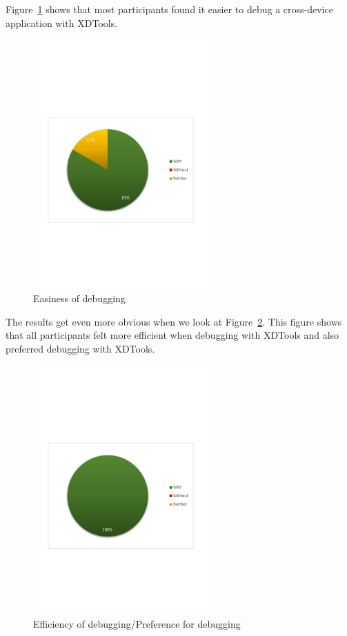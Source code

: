 Figure~\ref{fig:debugging_easier} shows that most participants found it easier to debug a cross-device application with XDTools.

\begin{figure}[H]
  \centering
    \includegraphics[width=0.6\textwidth]{images/charts/debugging_easier.pdf}
	\caption[Easiness of debugging]{Easiness of debugging}
	\label{fig:debugging_easier}
\end{figure}

The results get even more obvious when we look at Figure~\ref{fig:debugging_efficient}. This figure shows that all participants felt more efficient when debugging with XDTools and also preferred debugging with XDTools.

\begin{figure}[H]
  \centering
    \includegraphics[width=0.6\textwidth]{images/charts/debugging_efficient.pdf}
	\caption[Efficiency of debugging]{Efficiency of debugging/Preference for debugging}
	\label{fig:debugging_efficient}
\end{figure}

